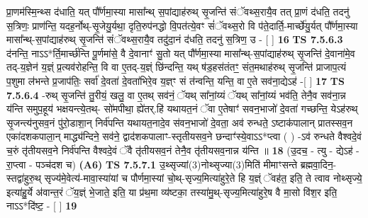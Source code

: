 \documentclass[17pt]{extarticle}
\begin{document}
                  प्रा॒णम॑स्मि॒न्थ्स द॑धाति॒ यत् पौ᳚र्णमा॒स्या मासा᳚न्थ् स॒पांद्याह॑रुथ् सृ॒जन्ति॑ संॅवथ्स॒रायै॒व तत् प्रा॒णं द॑धति॒ तदनु॑ स॒त्रिणः॒ प्राण॑न्ति॒ यदह॒र्नोथ्-सृ॒जेयु॒र्यथा॒ दृति॒रुप॑नद्धो वि॒पत॑त्ये॒वꣳ सं॑ॅवथ्स॒रो वि प॑ते॒दार्ति॒-मार्च्छे॑यु॒र्यत् पौ᳚र्णमा॒स्या मासा᳚न्थ्-स॒पांद्याह॑रुथ् सृ॒जन्ति॑ संॅवथ्स॒रायै॒व तदु॑दा॒नं द॑धति॒ तदनु॑ स॒त्रिण॒ उ - [  ] \textbf{  16} \newline
                  \newline
                                \textbf{ TS 7.5.6.3} \newline
                  द॑नन्ति॒ नाऽऽ*र्ति॒मार्च्छ॑न्ति पू॒र्णमा॑से॒ वै दे॒वानाꣳ॑ सु॒तो यत् पौ᳚र्णमा॒स्या मासा᳚न्थ्-स॒पांद्याह॑रुथ् सृ॒जन्ति॑ दे॒वाना॑मे॒व तद्-य॒ज्ञेन॑ य॒ज्ञ्ं प्र॒त्यव॑रोहन्ति॒ वि वा ए॒तद्-य॒ज्ञ्ं छि॑न्दन्ति॒ यथ् ष॑ड॒हस॑तंतꣳ॒॒ संत॒मथाह॑रुथ् सृ॒जन्ति॑ प्राजाप॒त्यं प॒शुमा ल॑भन्ते प्र॒जाप॑तिः॒ सर्वा॑ दे॒वता॑ दे॒वता॑भिरे॒व य॒ज्ञ्ꣳ सं त॑न्वन्ति॒ यन्ति॒ वा ए॒ते सव॑ना॒द्येऽह॑ -[  ] \textbf{  17} \newline
                  \newline
                                \textbf{ TS 7.5.6.4} \newline
                  -रुथ् सृ॒जन्ति॑ तु॒रीयं॒ खलु॒ वा ए॒तथ् सव॑नं॒ ॅयथ् सा᳚नां॒य्यं ॅयथ् सा᳚नां॒य्यं भव॑ति॒ तेनै॒व सव॑ना॒न्न य॑न्ति समुप॒हूय॑ भक्षयन्त्ये॒तथ्- सो॑मपीथा॒ ह्ये॑तर्.हि॑ यथायत॒नं ॅवा ए॒तेषाꣳ॑ सवन॒भाजो॑ दे॒वता॑ गच्छन्ति॒ येऽह॑रुथ् सृ॒जन्त्य॑नुसव॒नं पु॑रो॒डाशा॒न् निर्व॑पन्ति यथायत॒नादे॒व स॑वन॒भाजो॑ दे॒वता॒ अव॑ रुन्धते॒ ऽष्टाक॑पालान् प्रातस्सव॒न एका॑दशकपाला॒न् माद्ध्य॑न्दिने॒ सव॑ने॒ द्वाद॑शकपालाꣳ-स्तृतीयसव॒ने छन्दाꣳ॑स्ये॒वाऽऽ*प्त्वा ( ) -ऽव॑ रुन्धते वैश्वदे॒वं च॒रुं तृ॑तीयसव॒ने निर्व॑पन्ति वैश्वदे॒वं ॅवै तृ॑तीयसव॒नं तेनै॒व तृ॑तीयसव॒नान्न य॑न्ति ॥ \textbf{  18} \newline
                  \newline
                      (उ॒दच॒ - त्यु - द्येऽह॑ - रा॒प्त्वा - पञ्च॑दश च)  \textbf{(A6)} \newline \newline
                                        \textbf{ TS 7.5.7.1} \newline
                  उ॒थ्सृज्यां(3)नोथ्सृज्या(3)मिति॑ मीमाꣳसन्ते ब्रह्मवा॒दिन॒-स्तद्वा॑हुरु॒थ् सृज्य॑मे॒वेत्य॑-मावा॒स्या॑यां च पौर्णमा॒स्यां चो॒थ्-सृज्य॒मित्या॑हुरे॒ते हि य॒ज्ञ्ं ॅवह॑त॒ इति॒ ते त्वाव नोथ्सृज्ये॒ इत्या॑हु॒र्ये अ॑वान्त॒रं ॅय॒ज्ञ्ं भे॒जाते॒ इति॒ या प्र॑थ॒मा व्य॑ष्टका॒ तस्या॑मु॒थ्-सृज्य॒मित्या॑हुरे॒ष वै मा॒सो वि॑श॒र इति॒ नाऽऽ*दि॑ष्ट॒ - [  ] \textbf{  19} \newline
\end{document}
